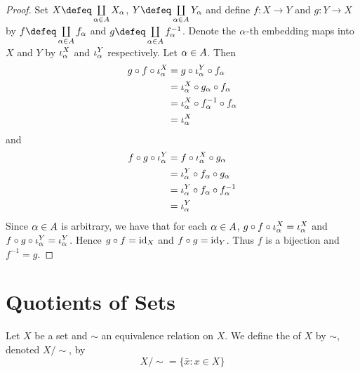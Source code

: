 \documentclass{book}
\begin{document}
	\begin{proof}
		Set $X \defeq \coprod\limits_{\al \in A} X_{\al}$, $Y \defeq \coprod\limits_{\al \in A}Y_{\al}$ and define $f: X \rightarrow Y$ and $g: Y \rightarrow X$ by $f \defeq \coprod\limits_{\al \in A} f_{\al}$ and $g \defeq \coprod\limits_{\al \in A} f_{\al}^{-1}$. Denote the $\alpha$-th embedding maps into $X$ and $Y$ by $\iota^X_{\alpha}$ and $\iota^Y_{\alpha}$ respectively. Let $\alpha \in A$. Then
		\begin{align*}
			g \circ f \circ \iota_{\alpha}^X
			& = g \circ \iota_{\alpha}^Y \circ f_{\alpha} \\
			& = \iota_{\alpha}^X \circ g_{\alpha} \circ f_{\alpha} \\
			& = \iota_{\alpha}^X \circ f_{\alpha}^{-1} \circ f_{\alpha} \\
			& = \iota_{\alpha}^X 
		\end{align*}
		and 
		\begin{align*}
			f \circ g \circ \iota_{\alpha}^Y
			& = f \circ \iota_{\alpha}^X \circ g_{\alpha} \\
			& = \iota_{\alpha}^Y \circ f_{\alpha} \circ g_{\alpha} \\
			& = \iota_{\alpha}^Y \circ f_{\alpha} \circ f_{\alpha}^{-1} \\
			& = \iota_{\alpha}^Y 
		\end{align*}
		Since $\alpha \in A$ is arbitrary, we have that for each $\alpha \in A$, $g \circ f \circ \iota_{\alpha}^X = \iota_{\alpha}^X$ and $f \circ g \circ \iota_{\alpha}^Y = \iota_{\alpha}^Y$. Hence $g \circ f = \operatorname{id}_X$ and $f \circ g = \operatorname{id}_Y$. Thus $f$ is a bijection and $f^{-1} = g$. 
	\end{proof}
	
	
	
	
	
	
	
	
	
	
	
	
	
	
	
	
	
	
	
	
	
	
	
	
	
	
	
	
	
	
	
	\newpage
	\section{Quotients of Sets}
	\begin{defn}
	Let $X$ be a set and $\sim$ an equivalence relation on $X$. We define the  of $X$ by $\sim$, denoted $X/ {\sim}$, by 
	\begin{equation*}
	X/ {\sim} = \{\bar{x}: x \in X\}
	\end{equation*}
	\end{defn}
	
\end{document}
